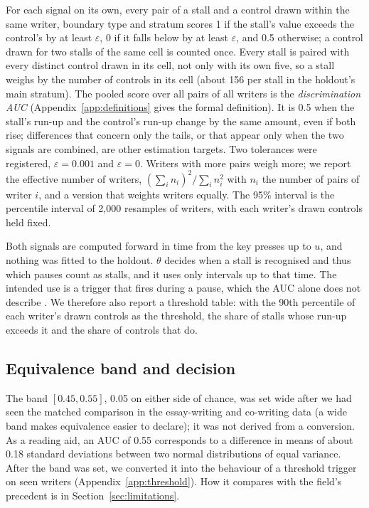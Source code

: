 For each signal on its own, every pair of a stall and a control drawn within the same writer, boundary type and stratum
scores 1 if the stall's value exceeds the control's by at least $\varepsilon$, 0 if it falls below by at least
$\varepsilon$, and 0.5 otherwise; a control drawn for two stalls of the same cell is counted once. Every stall is
paired with every distinct control drawn in its cell, not only with its own five, so a stall weighs by the number of
controls in its cell (about 156 per stall in the holdout's main stratum). The pooled score over
all pairs of all writers is the \emph{discrimination AUC} (Appendix~\ref{app:definitions} gives the formal definition).
It is 0.5 when the stall's run-up and the control's run-up change by the same amount, even if both rise; differences
that concern only the tails, or that appear only when the two signals are combined, are other estimation targets. Two
tolerances were registered, $\varepsilon = 0.001$ and $\varepsilon = 0$. Writers with more pairs weigh more; we report
the effective number of writers, $(\sum_i n_i)^2 / \sum_i n_i^2$ with $n_i$ the number of pairs of writer $i$, and a
version that weights writers equally. The 95\% interval is the percentile interval of 2,000 resamples of writers, with
each writer's drawn controls held fixed.

Both signals are computed forward in time from the key presses up to $u$, and nothing was fitted to the holdout.
$\theta$ decides when a stall is recognised and thus which pauses count as stalls, and it uses only intervals up to that
time. The intended use is a trigger that fires during a pause, which the AUC alone does not
describe \cite{pelanek2015metrics}. We therefore also report a threshold table: with the 90th percentile of each
writer's drawn controls as the threshold, the share of stalls whose run-up exceeds it and the share of controls that do.

\subsection{Equivalence band and decision}

The band $[0.45, 0.55]$, 0.05 on either side of chance, was set wide after we had seen the matched comparison
in the essay-writing and co-writing data (a wide band makes equivalence easier to declare); it was not derived from a conversion. As a reading aid, an AUC of 0.55
corresponds to a difference in means of about 0.18 standard deviations between two normal distributions of equal
variance. After the band was set, we converted it into the behaviour of a threshold trigger on seen writers
(Appendix~\ref{app:threshold}). How it compares with the field's precedent is in Section~\ref{sec:limitations}.

